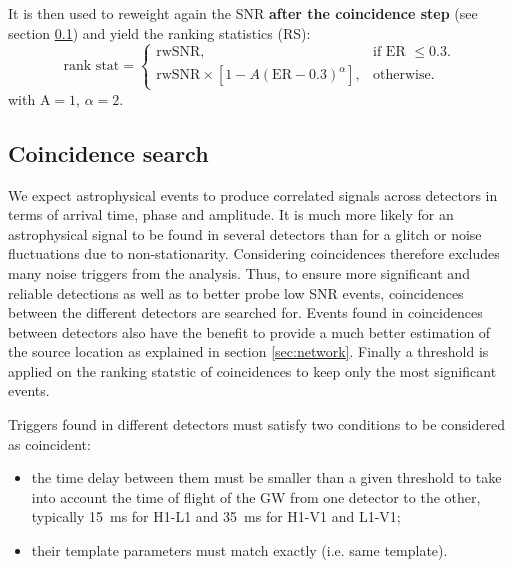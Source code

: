 It is then used to reweight again the SNR \textbf{after the coincidence step} (see section \ref{sec:coinc_search}) and yield the ranking statistics (RS):
%
\begin{equation}
\label{eq:rank_stat}
  \textrm{rank stat} = \begin{cases}
    \textrm{rwSNR}, & \textrm{if ER $\leq 0.3$}.\\
    \textrm{rwSNR} \times \left[1-A(\textrm{ER}-0.3)^\alpha \right], & \text{otherwise}.
  \end{cases}
\end{equation}
%
with $\text{A}=1$, $\alpha = 2$.



\subsection{Coincidence search}
\label{sec:coinc_search}
We expect astrophysical events to produce correlated signals across detectors in terms of arrival time, phase and amplitude.
It is much more likely for an astrophysical signal to be found in several detectors than for a glitch or noise fluctuations due to non-stationarity.
Considering coincidences therefore excludes many noise triggers from the analysis.
Thus, to ensure more significant and reliable detections as well as to better probe low SNR events, coincidences between the different detectors are searched for.
Events found in coincidences between detectors also have the benefit to provide a much better estimation of the source location as explained in section \ref{sec:network}.
Finally a threshold is applied on the ranking statstic of coincidences to keep only the most significant events.

Triggers found in different detectors must satisfy two conditions to be considered as coincident:
%
\begin{itemize}
\item the time delay between them must be smaller than a given threshold to take into account the time of flight of the GW from one detector to the other,
  typically \SI{15}{\milli\second} for H1-L1 and \SI{35}{\milli\second} for H1-V1 and L1-V1;
\item their template parameters must match exactly (i.e. same template).
\end{itemize}
%

